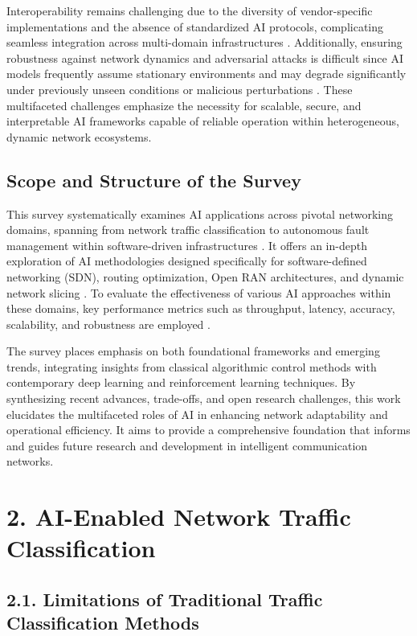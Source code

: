 \documentclass[11pt]{article}
\begin{document}
Interoperability remains challenging due to the diversity of vendor-specific implementations and the absence of standardized AI protocols, complicating seamless integration across multi-domain infrastructures \cite{ref30,ref48}. Additionally, ensuring robustness against network dynamics and adversarial attacks is difficult since AI models frequently assume stationary environments and may degrade significantly under previously unseen conditions or malicious perturbations \cite{ref49,ref50,ref53}. These multifaceted challenges emphasize the necessity for scalable, secure, and interpretable AI frameworks capable of reliable operation within heterogeneous, dynamic network ecosystems.

\subsection{Scope and Structure of the Survey}

This survey systematically examines AI applications across pivotal networking domains, spanning from network traffic classification to autonomous fault management within software-driven infrastructures \cite{ref31,ref32}. It offers an in-depth exploration of AI methodologies designed specifically for software-defined networking (SDN), routing optimization, Open RAN architectures, and dynamic network slicing \cite{ref33,ref34,ref35}. To evaluate the effectiveness of various AI approaches within these domains, key performance metrics such as throughput, latency, accuracy, scalability, and robustness are employed \cite{ref51,ref52}. 

The survey places emphasis on both foundational frameworks and emerging trends, integrating insights from classical algorithmic control methods with contemporary deep learning and reinforcement learning techniques. By synthesizing recent advances, trade-offs, and open research challenges, this work elucidates the multifaceted roles of AI in enhancing network adaptability and operational efficiency. It aims to provide a comprehensive foundation that informs and guides future research and development in intelligent communication networks.

\section{2. AI-Enabled Network Traffic Classification}

\subsection{2.1. Limitations of Traditional Traffic Classification Methods}
\end{document}
